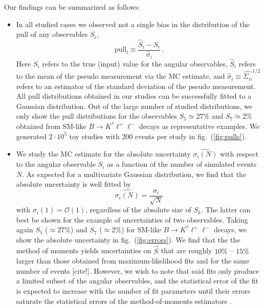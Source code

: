 \documentclass[aps,prd,reprint,nofootinbib,preprintnumbers]{revtex4}
\newcommand{\est}[1]{\widehat{#1}}
\newcommand{\order}[1]{\mathcal{O}\left({#1}\right)}
\newcommand{\reffig}[1]{fig.~(\ref{fig:#1})}
\newcommand{\todo}[1]{{\color{red}\bf ToDo: #1}}
\newcommand{\danny}[1]{{\color{purple}#1}}
\begin{document}
Our findings can be summarized as follows:
\begin{itemize}
    \item In all studied cases we observed not a single bias in the distribution of the $\mathrm{pull}$
        of any observables $S_i$,
        \begin{equation}
            \mathrm{pull_i} \equiv \frac{\est{S}_i - S_i}{\est{\sigma}_{i}}\,.
        \end{equation}
        Here $S_i$ refers to the true (input) value for the angular observables, $\est{S}_i$ refers to the
        mean of the pseudo measurement via the MC estimate, and $\est{\sigma}_{i} \equiv \est{\Sigma_{ii}}^{1/2}$
        refers to an estimator of the standard deviation of the pseudo measurement. All pull distributions
        obtained in our studies can be successfully
        fitted to a Gaussian distribution. Out of the large number  of studied distributions, we only show the pull distributions for the observables
        $S_5 \simeq 27\%$ and $S_7 \simeq 2\%$ obtained from SM-like $B\to K^*\ell^+\ell^-$
        decays as representative examples. We generated $2\cdot 10^5$ toy studies
        with $200$ events per study in \reffig{pulls}.
    \item We study the MC estimate for the absolute uncertainty $\est{\sigma_i(N)}$ with respect to the angular observable $S_i$
        as a function of the number of simulated events $N$. As expected for a multivariate Gaussian
        distribution, we find that the absolute uncertainty is well fitted by
        \begin{equation}
            \label{eq:unc-on-mean}
            \est{\sigma_i(N)} = \frac{\sigma_i}{\sqrt{N}}
        \end{equation}
        with $\sigma_i(1) = \order{1}$, regardless of the absolute size of $S_k$. The latter can best be shown
        for the example of uncertainties of two observables. Taking again $S_5$ ($\simeq 27\%$) and $S_7$ ($\simeq 2\%$)
        for SM-like $B\to K^*\ell^+\ell^-$ decays, we show the absolute uncertainty in \reffig{errors}.
        We find that the the method of moments yields uncertainties on $\vec{S}$ that are roughly
        $10\%$ -- $15\%$ larger than those obtained from maximum-likelihood fits and for the same
        number of events \danny{[cite!]}. However, we wish to note that said fits only produce a limited
        subset of the angular observables, and the statistical error of the fit is expected to increase
        with the number of fit parameters until their errors saturate the statistical errors of the method-of-moments
        estimators \cite[sec. 8]{Cowan:1998ji}.
\end{itemize}
\end{document}
